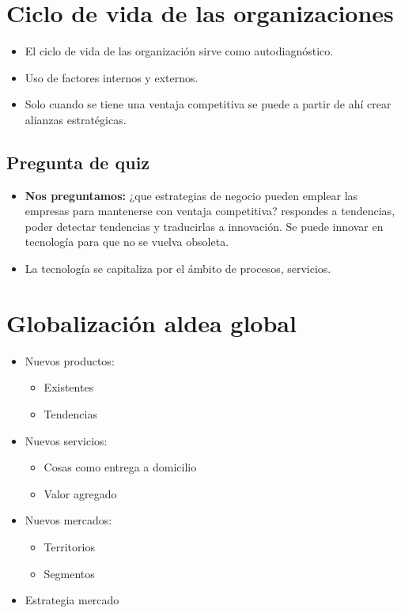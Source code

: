 \section{Ciclo de vida de las organizaciones}
\begin{itemize}
    \item El ciclo de vida de las organización sirve como autodiagnóstico.
    \item Uso de factores internos y externos.
    \item Solo cuando se tiene una ventaja competitiva se puede a partir de ahí crear alianzas estratégicas. 
\end{itemize}


\subsection{Pregunta de quiz}
\begin{itemize}
    \item \textbf{Nos preguntamos:} ¿que estrategias de negocio pueden emplear las empresas para mantenerse con ventaja competitiva? respondes a tendencias, poder detectar tendencias y traducirlas a innovación. Se puede innovar en tecnología para que no se vuelva obsoleta.
    \item La tecnología se capitaliza por el ámbito de procesos, servicios.
\end{itemize}


\section{Globalización aldea global}
\begin{itemize}
    \item Nuevos productos:
        \begin{itemize}
            \item Existentes 
            \item Tendencias 
        \end{itemize}
    
    \item Nuevos servicios: 
        \begin{itemize}
            \item Cosas como entrega a domicilio 
            \item Valor agregado 
        \end{itemize}
        
    \item Nuevos mercados:
        \begin{itemize}
            \item Territorios
            \item Segmentos 
        \end{itemize}

    \item Estrategia mercado
\end{itemize}

